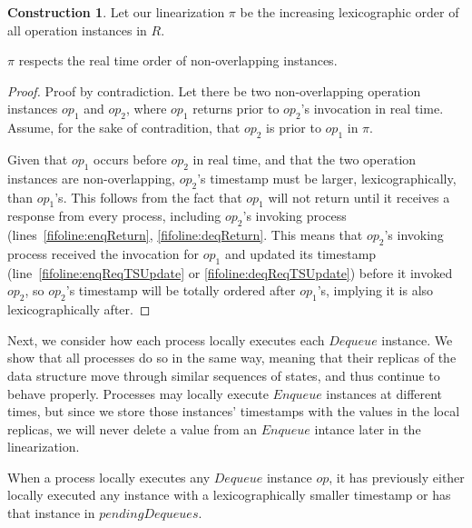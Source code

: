 \documentclass[a4paper,anonymous,USenglish]{lipics-v2021} %
\theoremstyle{definition}
\newtheorem{construction}{Construction}
\begin{document}
\begin{construction}\label{constr:fifo}
  Let our linearization $\pi$ be the increasing lexicographic order of all operation instances in $R$.
\end{construction}

\begin{lemma}\label{fifolem:realTimeOrder}
  $\pi$ respects the real time order of non-overlapping instances.
\end{lemma}
\begin{proof}
  Proof by contradiction. Let there be two non-overlapping operation instances $op_1$ and $op_2$, where $op_1$ returns prior to $op_2$'s invocation in real time.  Assume, for the sake of contradition, that $op_2$ is prior to $op_1$ in $\pi$.
  
  Given that $op_1$ occurs before $op_2$ in real time, and that the two operation instances are non-overlapping, $op_2$'s timestamp must be larger, lexicographically, than $op_1$'s.  This follows from the fact that $op_1$ will not return until it receives a response from every process, including $op_2$'s invoking process (lines~\ref{fifoline:enqReturn}, \ref{fifoline:deqReturn}.  This means that $op_2$'s invoking process received the invocation for $op_1$ and updated its timestamp (line~\ref{fifoline:enqReqTSUpdate} or \ref{fifoline:deqReqTSUpdate}) before it invoked $op_2$, so $op_2$'s timestamp will be totally ordered after $op_1$'s, implying it is also lexicographically after.
\end{proof}

Next, we consider how each process locally executes each $Dequeue$ instance.  We show that all processes do so in the same way, meaning that their replicas of the data structure move through similar sequences of states, and thus continue to behave properly.  Processes may locally execute $Enqueue$ instances at different times, but since we store those instances' timestamps with the values in the local replicas, we will never delete a value from an $Enqueue$ intance later in the linearization.

\begin{lemma}\label{fifolem:prevLocalExec}
  When a process locally executes any $Dequeue$ instance $op$, it has previously either locally executed any instance with a lexicographically smaller timestamp or has that instance in $pendingDequeues$.
\end{lemma}
\end{document}
